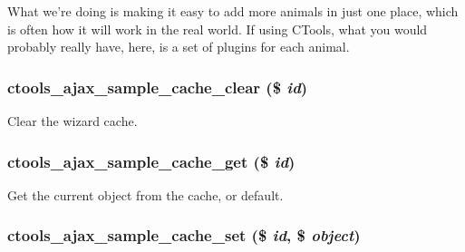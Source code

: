 What we're doing is making it easy to add more animals in just one place, which is often how it will work in the real world. If using CTools, what you would probably really have, here, is a set of plugins for each animal. \hypertarget{ctools__ajax__sample_8module_a3e67af16ed2922d6ed1d25706e8a96bd}{
\subsubsection[{ctools\_\-ajax\_\-sample\_\-cache\_\-clear}]{\setlength{\rightskip}{0pt plus 5cm}ctools\_\-ajax\_\-sample\_\-cache\_\-clear (\$ {\em id})}}
\label{ctools__ajax__sample_8module_a3e67af16ed2922d6ed1d25706e8a96bd}
Clear the wizard cache. \hypertarget{ctools__ajax__sample_8module_add5dc6bf716e16e91dd60a01e37159a7}{
\subsubsection[{ctools\_\-ajax\_\-sample\_\-cache\_\-get}]{\setlength{\rightskip}{0pt plus 5cm}ctools\_\-ajax\_\-sample\_\-cache\_\-get (\$ {\em id})}}
\label{ctools__ajax__sample_8module_add5dc6bf716e16e91dd60a01e37159a7}
Get the current object from the cache, or default. \hypertarget{ctools__ajax__sample_8module_a64200d68fbc8efb5597f69b3d138d165}{
\subsubsection[{ctools\_\-ajax\_\-sample\_\-cache\_\-set}]{\setlength{\rightskip}{0pt plus 5cm}ctools\_\-ajax\_\-sample\_\-cache\_\-set (\$ {\em id}, \/  \$ {\em object})}}
\label{ctools__ajax__sample_8module_a64200d68fbc8efb5597f69b3d138d165}
